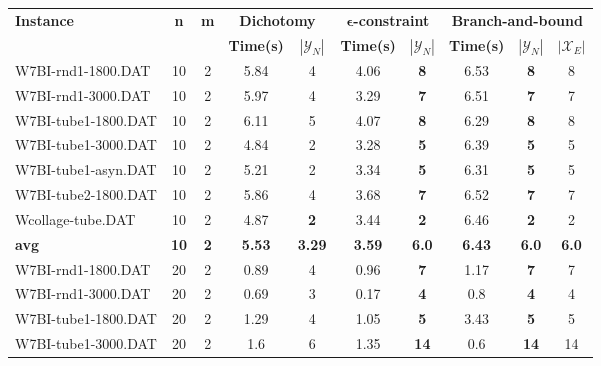 \begin{table}[h]
\centering
\hspace*{-1cm}\begin{tabular}{lccccccccc}
\toprule
\textbf{Instance} & \textbf{n} & \textbf{m} & \multicolumn{2}{c}{\textbf{Dichotomy}} & \multicolumn{2}{c}{\textbf{$\mathbf{\epsilon}$-constraint}}  & \multicolumn{3}{c}{\textbf{Branch-and-bound}}
\\
\cmidrule(r){4-5} \cmidrule(r){6-7} \cmidrule(r){8-10}
~ & ~ & ~ & \textbf{Time(s)} & \textbf{$|\mathcal{Y}_N|$} & \textbf{Time(s)} & \textbf{$|\mathcal{Y}_N|$} & \textbf{Time(s)} & \textbf{$|\mathcal{Y}_N|$} & \textbf{$|\mathcal{X}_E|$} \\
\midrule

W7BI-rnd1-1800.DAT & 10 & 2 & 5.84 & 4 &  \textcolor{blue2}{4.06} &  \textbf{8} & 6.53 &  \textbf{8}  & 8 \\
W7BI-rnd1-3000.DAT & 10 & 2 & 5.97 & 4 &  \textcolor{blue2}{3.29} &  \textbf{7} & 6.51 &  \textbf{7}  & 7 \\
W7BI-tube1-1800.DAT & 10 & 2 & 6.11 & 5 &  \textcolor{blue2}{4.07} &  \textbf{8} & 6.29 &  \textbf{8}  & 8 \\
W7BI-tube1-3000.DAT & 10 & 2 & 4.84 & 2 &  \textcolor{blue2}{3.28} &  \textbf{5} & 6.39 &  \textbf{5}  & 5 \\
W7BI-tube1-asyn.DAT & 10 & 2 & 5.21 & 2 &  \textcolor{blue2}{3.34} &  \textbf{5} & 6.31 &  \textbf{5}  & 5 \\
W7BI-tube2-1800.DAT & 10 & 2 & 5.86 & 4 &  \textcolor{blue2}{3.68} &  \textbf{7} & 6.52 &  \textbf{7}  & 7 \\
Wcollage-tube.DAT & 10 & 2 & 4.87 &  \textbf{2} &  \textcolor{blue2}{3.44} &  \textbf{2} & 6.46 &  \textbf{2}  & 2 \\
\cline{1-10} \textbf{avg} & \textbf{10} & \textbf{2} & \textbf{5.53} & \textbf{3.29} & \textbf{3.59} & \textbf{6.0} & \textbf{6.43} & \textbf{6.0} & \textbf{6.0} \\ \cline{1-10}
W7BI-rnd1-1800.DAT & 20 & 2 &  \textcolor{blue2}{0.89} & 4 & 0.96 &  \textbf{7} & 1.17 &  \textbf{7}  & 7 \\
W7BI-rnd1-3000.DAT & 20 & 2 & 0.69 & 3 &  \textcolor{blue2}{0.17} &  \textbf{4} & 0.8 &  \textbf{4}  & 4 \\
W7BI-tube1-1800.DAT & 20 & 2 & 1.29 & 4 &  \textcolor{blue2}{1.05} &  \textbf{5} & 3.43 &  \textbf{5}  & 5 \\
W7BI-tube1-3000.DAT & 20 & 2 & 1.6 & 6 & 1.35 &  \textbf{14} &  \textcolor{blue2}{0.6} &  \textbf{14}  & 14 \\

\end{tabular}
\end{table}
